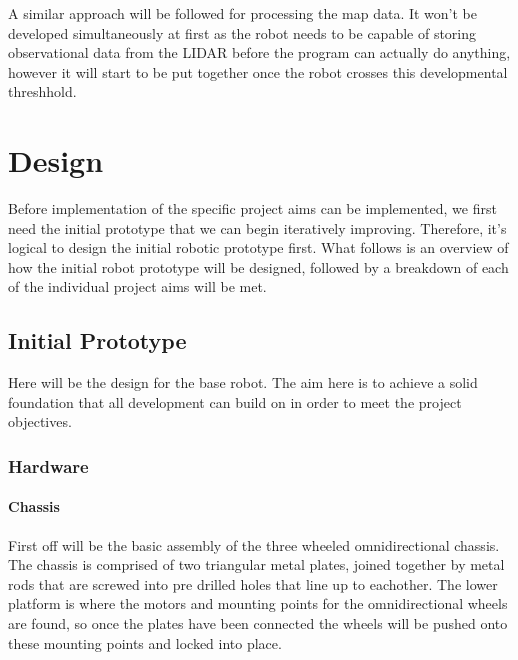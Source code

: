 		A similar approach will be followed for processing the map data. It won't be developed simultaneously at first as the robot needs to be capable of storing observational data from the LIDAR before the program can actually do anything, however it will start to be put together once the robot crosses this developmental threshhold.
	
	\chapter{Design}
	Before implementation of the specific project aims can be implemented, we first need the initial prototype that we can begin iteratively improving. Therefore, it's logical to design the initial robotic prototype first. What follows is an overview of how the initial robot prototype will be designed, followed by a breakdown of each of the individual project aims will be met.
	
		\section{Initial Prototype}
		Here will be the design for the base robot. The aim here is to achieve a solid foundation that all development can build on in order to meet the project objectives.
			\subsection{Hardware}
				\subsubsection{Chassis}
				First off will be the basic assembly of the three wheeled omnidirectional chassis. The chassis is comprised of two triangular metal plates, joined together by metal rods that are screwed into pre drilled holes that line up to eachother. The lower platform is where the motors and mounting points for the omnidirectional wheels are found, so once the plates have been connected the wheels will be pushed onto these mounting points and locked into place.
				
